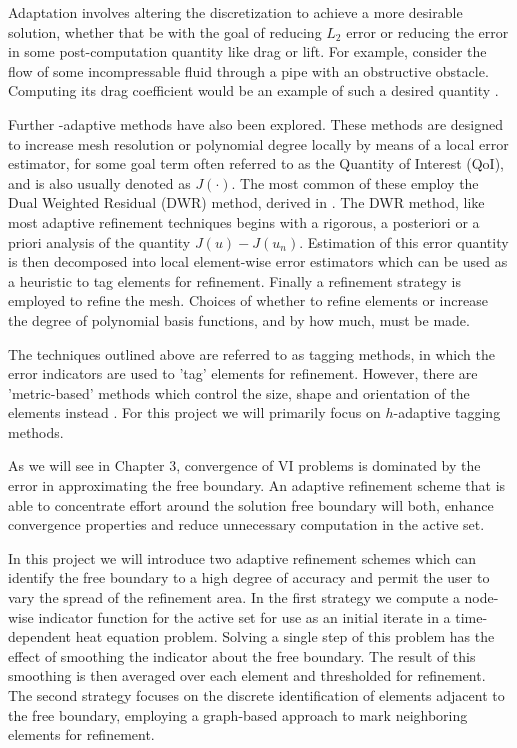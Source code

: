 \documentclass[]{interact}
\theoremstyle{plain}%
\theoremstyle{definition}
\theoremstyle{remark}
\begin{document}
Adaptation involves altering the discretization to achieve a more desirable solution, whether that be with the goal of reducing $L_2$ error or reducing the error in some post-computation quantity like drag or lift. For example, consider the flow of some incompressable fluid through a pipe with an obstructive obstacle. Computing its drag coefficient would be an example of such a desired quantity \citep[Chapter 1.1]{BangerthRannacher2003}.

Further -adaptive methods have also been explored. These methods are designed to increase mesh resolution or polynomial degree locally by means of a local error estimator, for some goal term often referred to as the Quantity of Interest (QoI), and is also usually denoted as $J(\cdot)$. The most common of these employ the Dual Weighted Residual (DWR) method, derived in \cite{RannacherSuttmeier1997}. The DWR method, like most adaptive refinement techniques begins with a rigorous, a posteriori or a priori analysis of the quantity $J(u) - J(u_n)$. Estimation of this error quantity is then decomposed into local element-wise error estimators which can be used as a heuristic to tag elements for refinement. Finally a refinement strategy is employed to refine the mesh. Choices of whether to refine elements or increase the degree of polynomial basis functions, and by how much, must be made. 

The techniques outlined above are referred to as tagging methods, in which the error indicators are used to 'tag' elements for refinement. However, there are 'metric-based' methods which control the size, shape and orientation of the elements instead \citep{Alauzet2010}.  For this project we will primarily focus on $h$-adaptive tagging methods.

As we will see in Chapter 3, convergence of VI problems is dominated by the error in approximating the free boundary. An adaptive refinement scheme that is able to concentrate effort around the solution free boundary will both, enhance convergence properties and reduce unnecessary computation in the active set.


In this project we will introduce two adaptive refinement schemes which can identify the free boundary to a high degree of accuracy and permit the user to vary the spread of the refinement area. In the first strategy we compute a node-wise indicator function for the active set for use as an initial iterate in a time-dependent heat equation problem. Solving a single step of this problem has the effect of smoothing the indicator about the free boundary. The result of this smoothing is then averaged over each element and thresholded for refinement. The second strategy focuses on the discrete identification of elements adjacent to the free boundary, employing a graph-based approach to mark neighboring elements for refinement.
\end{document}
